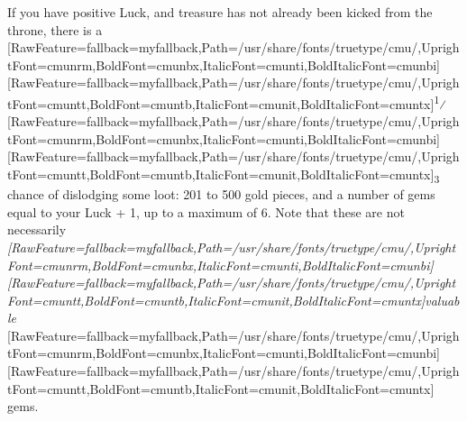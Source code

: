 If you have positive Luck, and treasure has not already been kicked from the throne, there is a \allowbreak{}\setmainfont{cmunrm.ttf}[RawFeature={fallback=myfallback},Path=/usr/share/fonts/truetype/cmu/,UprightFont=cmunrm,BoldFont=cmunbx,ItalicFont=cmunti,BoldItalicFont=cmunbi]\setmonofont{cmunrm.ttf}[RawFeature={fallback=myfallback},Path=/usr/share/fonts/truetype/cmu/,UprightFont=cmuntt,BoldFont=cmuntb,ItalicFont=cmunit,BoldItalicFont=cmuntx]\textsuperscript{1}⁄\allowbreak{}\setmainfont{cmunrm.ttf}[RawFeature={fallback=myfallback},Path=/usr/share/fonts/truetype/cmu/,UprightFont=cmunrm,BoldFont=cmunbx,ItalicFont=cmunti,BoldItalicFont=cmunbi]\setmonofont{cmunrm.ttf}[RawFeature={fallback=myfallback},Path=/usr/share/fonts/truetype/cmu/,UprightFont=cmuntt,BoldFont=cmuntb,ItalicFont=cmunit,BoldItalicFont=cmuntx]\textsubscript{3} chance of dislodging some loot: 201 to 500 gold pieces, and a number of gems equal to your Luck + 1, up to a maximum of 6. Note that these are not necessarily {\itshape \allowbreak{}\setmainfont{cmunti.ttf}[RawFeature={fallback=myfallback},Path=/usr/share/fonts/truetype/cmu/,UprightFont=cmunrm,BoldFont=cmunbx,ItalicFont=cmunti,BoldItalicFont=cmunbi]\setmonofont{cmunti.ttf}[RawFeature={fallback=myfallback},Path=/usr/share/fonts/truetype/cmu/,UprightFont=cmuntt,BoldFont=cmuntb,ItalicFont=cmunit,BoldItalicFont=cmuntx]\itshape valuable}{$\text{ }$}\allowbreak{}\setmainfont{cmunrm.ttf}[RawFeature={fallback=myfallback},Path=/usr/share/fonts/truetype/cmu/,UprightFont=cmunrm,BoldFont=cmunbx,ItalicFont=cmunti,BoldItalicFont=cmunbi]\setmonofont{cmunrm.ttf}[RawFeature={fallback=myfallback},Path=/usr/share/fonts/truetype/cmu/,UprightFont=cmuntt,BoldFont=cmuntb,ItalicFont=cmunit,BoldItalicFont=cmuntx] gems.




